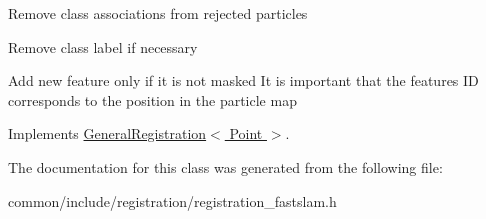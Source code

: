 Remove class associations from rejected particles

Remove class label if necessary

Add new feature only if it is not masked It is important that the features ID corresponds to the position in the particle map 



Implements \hyperlink{classGeneralRegistration}{GeneralRegistration$<$ Point $>$}.



The documentation for this class was generated from the following file:\begin{DoxyCompactItemize}
\item 
common/include/registration/registration\_\-fastslam.h\end{DoxyCompactItemize}
